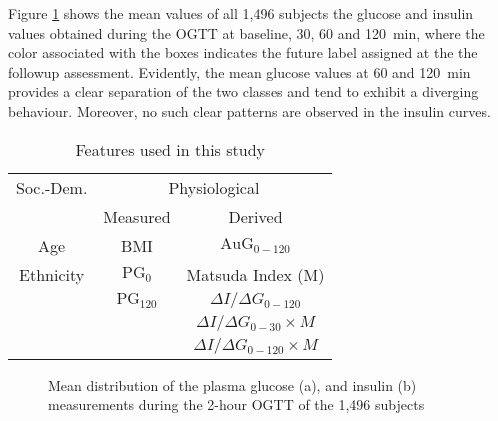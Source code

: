 \documentclass[a4paper,twoside]{article}
\begin{document}
Figure \ref{fig:ogtt_mean} shows the mean values of all 1,496 subjects the glucose and insulin values obtained during the OGTT at baseline, 30, 60 and \SI{120}{\minute}, where the color associated with the boxes indicates the future label assigned at the the followup assessment. Evidently, the mean glucose values at 60 and \SI{120}{\minute} provides a clear separation of the two classes and tend to exhibit a diverging behaviour. Moreover, no such clear patterns are observed in the insulin curves.
%
%
\begin{table}[!htbp]
\centering
\begin{tabular}{c c c}
\toprule
{Soc.-Dem.} & \multicolumn{2}{c}{Physiological}{} \\
\cmidrule{2-3}
& Measured & Derived \\
\midrule \midrule
Age & BMI & $\textrm{AuG}_{0-120}$ \\
Ethnicity & $\textrm{PG}_0$ & Matsuda Index (M)  \\
& $\textrm{PG}_{120}$ & \( {\Delta I}/{\Delta G}_{0-120} \)\\
& & \( {\Delta I}/{\Delta G}_{0-30} \times M \) \\
& & \( {\Delta I}/{\Delta G}_{0-120} \times M \) \\
\bottomrule
\end{tabular}
\caption{Features used in this study}
\label{tab:features}
\end{table}
%
%
\begin{figure}[!h]
  \centering
  \hfil
      \caption{Mean distribution of the plasma glucose (a), and insulin (b) measurements during the 2-hour OGTT of the 1,496 subjects}
    \label{fig:ogtt_mean}
\end{figure}
%
\end{document}
